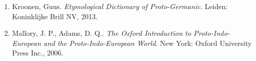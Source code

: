 \begin{enumerate}
\item Kroonen, Guus. \textit{Etymological Dictionary of Proto-Germanic}. Leiden: Koninklijke Brill NV, 2013.
\item Mallory, J. P., Adams, D. Q.. \textit{The Oxford Introduction to Proto-Indo-European and the Proto-Indo-European World}. New York: Oxford University Press Inc., 2006.
\end{enumerate}